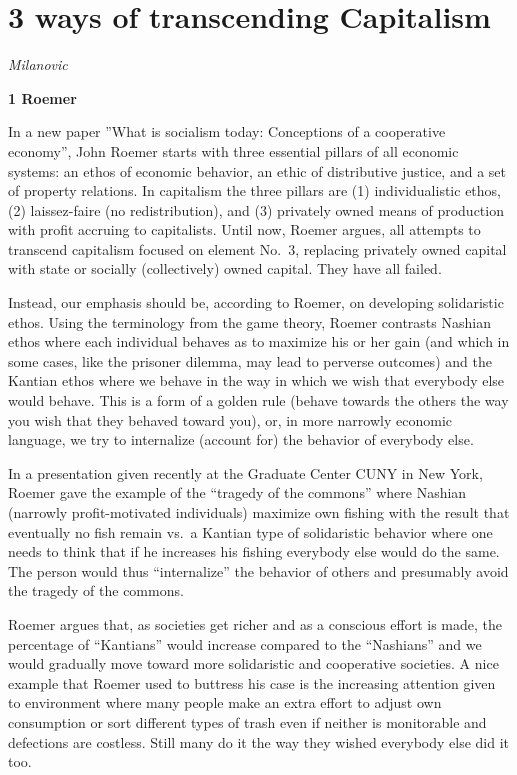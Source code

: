 \documentclass[
]{book}
\begin{document}
\hypertarget{ways-of-transcending-capitalism}{%
\section{3 ways of transcending Capitalism}\label{ways-of-transcending-capitalism}}

\emph{Milanovic}

\textbf{1 Roemer}

In a new paper ''What is socialism today: Conceptions of a cooperative economy'', John Roemer starts with three essential pillars of all economic systems: an ethos of economic behavior, an ethic of distributive justice, and a set of property relations. In capitalism the three pillars are (1) individualistic ethos, (2) laissez-faire (no redistribution), and (3) privately owned means of production with profit accruing to capitalists. Until now, Roemer argues, all attempts to transcend capitalism focused on element No.~3, replacing privately owned capital with state or socially (collectively) owned capital. They have all failed.

Instead, our emphasis should be, according to Roemer, on developing solidaristic ethos. Using the terminology from the game theory, Roemer contrasts Nashian ethos where each individual behaves as to maximize his or her gain (and which in some cases, like the prisoner dilemma, may lead to perverse outcomes) and the Kantian ethos where we behave in the way in which we wish that everybody else would behave. This is a form of a golden rule (behave towards the others the way you wish that they behaved toward you), or, in more narrowly economic language, we try to internalize (account for) the behavior of everybody else.

In a presentation given recently at the Graduate Center CUNY in New York, Roemer gave the example of the ``tragedy of the commons'' where Nashian (narrowly profit-motivated individuals) maximize own fishing with the result that eventually no fish remain vs.~a Kantian type of solidaristic behavior where one needs to think that if he increases his fishing everybody else would do the same. The person would thus ``internalize'' the behavior of others and presumably avoid the tragedy of the commons.

Roemer argues that, as societies get richer and as a conscious effort is made, the percentage of ``Kantians'' would increase compared to the ``Nashians'' and we would gradually move toward more solidaristic and cooperative societies. A nice example that Roemer used to buttress his case is the increasing attention given to environment where many people make an extra effort to adjust own consumption or sort different types of trash even if neither is monitorable and defections are costless. Still many do it the way they wished everybody else did it too.
\end{document}
